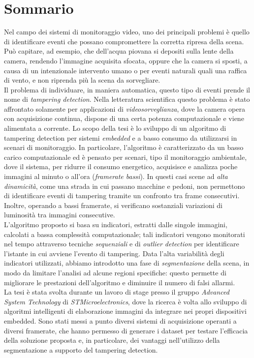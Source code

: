\newpage
\chapter*{Sommario}


Nel campo dei sistemi di monitoraggio video, uno dei principali problemi \`e quello di identificare eventi che possano compromettere la corretta ripresa della scena.
Pu\`o capitare, ad esempio, che dell'acqua piovana si depositi sulla lente della camera, rendendo l'immagine acquisita sfocata, oppure che la camera si sposti, a causa di un intenzionale intervento umano o per eventi naturali quali una raffica di vento, e non riprenda pi\`u la scena da sorvegliare.\\
Il problema di individuare, in maniera automatica, questo tipo di eventi prende il nome di \textit{tampering detection}. 
Nella letteratura scientifica questo problema \`e stato affrontato solamente per applicazioni di \textit{videosorveglianza}, dove la camera opera con acquisizione continua, dispone di una certa potenza computazionale e viene alimentata a corrente.
Lo scopo della tesi \`e lo sviluppo di un algoritmo di tampering detection per sistemi \textit{embedded} e a basso consumo da utilizzarsi in scenari di monitoraggio. In particolare, l'algoritmo \`e caratterizzato da un basso carico computazionale ed \`e pensato per scenari, tipo il monitoraggio ambientale, dove il sistema, per ridurre il consumo energetico, acquisisce e analizza poche immagini al minuto o all'ora (\textit{framerate bassi}).
In questi casi scene ad \textit{alta dinamicit\`a}, come una strada in cui passano macchine e pedoni, non permettono di identificare eventi di tampering tramite un confronto tra frame consecutivi. 
Inoltre, operando a bassi framerate, si verificano sostanziali variazioni di luminosit\`a tra immagini consecutive. \\ 
L'algoritmo proposto si basa su indicatori, estratti dalle singole immagini, calcolati a bassa complessit\`a computazionale; tali indicatori vengono monitorati nel tempo attraverso tecniche \textit{sequenziali} e di \textit{outlier detection} per identificare l'istante in cui avviene l'evento di tampering.
Data l'alta variabilit\`a degli indicatori utilizzati, abbiamo introdotto una fase di \textit{segmentazione} della scena, in modo da limitare l'analisi ad alcune regioni specifiche:
questo permette di migliorare le prestazioni dell'algoritmo e diminuire il numero di falsi allarmi.\\
La tesi \`e stata svolta durante un lavoro di stage presso il gruppo \textit{Advanced System Technology} di \textit{STMicroelectronics}, dove la ricerca \`e volta allo sviluppo di algoritmi intelligenti di elaborazione immagini da integrare nei propri dispositivi embedded.
Sono stati messi a punto diversi sistemi di acquisizione operanti a diversi framerate, che hanno permesso di generare i dataset per testare l'efficacia della soluzione proposta e, in particolare, dei vantaggi nell'utilizzo della segmentazione a supporto del tampering detection. 
